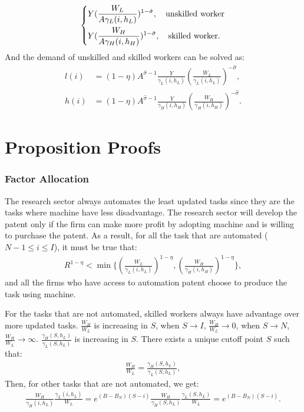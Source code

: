 \documentclass[12pt]{article}
\begin{document}
\begin{appendices}
\begin{align*}
\begin{dcases}
Y(\frac{W_L}{A\gamma_L(i,h_L)})^{1-\hat{\sigma}}, \quad \text{unskilled worker}  \\
Y(\frac{W_H}{A\gamma_H(i,h_H)})^{1-\hat{\sigma}}, \quad \text{skilled worker}.
\end{dcases}
\end{align*}
And the demand of unskilled and skilled workers can be solved as: 
\begin{align*}
l(i) &= (1-\eta)A^{\hat{\sigma}-1}\frac{Y}{\gamma_L(i,h_L)}(\frac{W_L}{\gamma_L(i,h_L)})^{-\hat{\sigma}}, \\
h(i) &= (1-\eta)A^{\hat{\sigma}-1}\frac{Y}{\gamma_H(i,h_H)}(\frac{W_H}{\gamma_H(i,h_H)})^{-\hat{\sigma}}.
\end{align*}
 
\section{Proposition Proofs}

\subsubsection*{Factor Allocation}
The research sector always automates the least updated tasks since they are the tasks where machine have less disadvantage. The research sector will develop the patent only if the firm can make more profit by adopting machine and is willing to purchase the patent. As a result, for all the task that are automated ($N-1 \le i \le I$), it must be true that:
\begin{align*}
R^{1-\eta} < \min \{(\frac{W_L}{\gamma_L(i,h_L)})^{1-\eta},(\frac{W_H}{\gamma_H(i,h_H)})^{1-\eta}\},
\end{align*}
and all the firms who have access to automation patent choose to produce the task using machine. 

For the tasks that are not automated, skilled workers always have advantage over more updated tasks. $\frac{W_H}{W_L}$ is increasing in $S$, when $S\to I$, $\frac{W_H}{W_L}\to 0$, when $S\to N$, $\frac{W_H}{W_L}\to \infty$. $ \frac{\gamma_H(S,h_L)}{\gamma_L(S,h_L)}$ is increasing in $S$. There exists a unique cutoff point $S$ such that:
\begin{align*}
\frac{W_H}{W_L} = \frac{\gamma_H(S,h_L)}{\gamma_L(S,h_L)},
\end{align*}
Then, for other tasks that are not automated, we get: 
\begin{align*}
\frac{W_H}{\gamma_H(i,h_L)}\frac{\gamma_L(i,h_L)}{W_L} = e^{(B-B_N)(S-i)}\frac{W_H}{\gamma_H(S,h_L)}\frac{\gamma_L(S,h_L)}{W_L} =  e^{(B-B_N)(S-i)}.
\end{align*}


\end{appendices}
\end{document}
